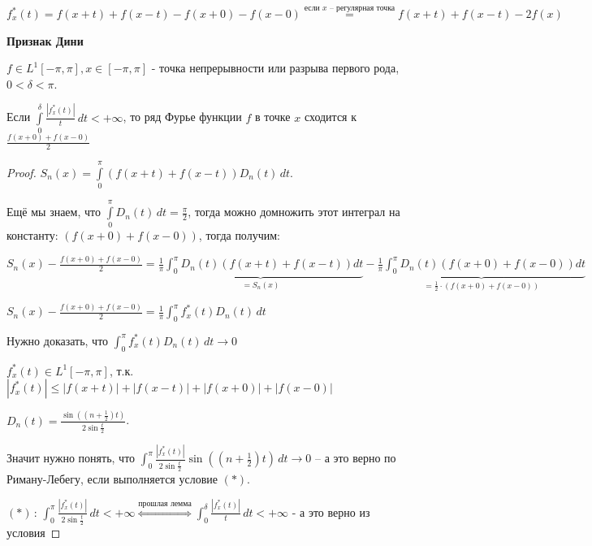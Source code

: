 \begin{definition}
    $f_x^* (t) = f(x + t) + f(x - t) - f(x + 0) - f(x - 0) \overset{\text{если $x$ -- регулярная точка}}{=} f(x + t) + f(x - t) - 2f(x)$    
\end{definition}

\begin{theorem}
    \textbf{Признак Дини}

    $f \in L^{1} [-\pi, \pi], x \in [-\pi, \pi]$ - точка непрерывности или разрыва первого рода, $0 < \delta < \pi$.
    
    Если $\int\limits_0^\delta \frac{|f_x^* (t)|}{t} \, dt < +\infty$, то ряд Фурье 
    функции $f$ в точке $x$ сходится к $\frac{f(x + 0) + f(x - 0)}{2}$
\end{theorem}

\begin{proof}
    $S_n (x) = \int\limits_0^\pi (f(x + t) + f(x - t)) D_n (t) \, dt$.
    
    Ещё мы знаем, что $\int\limits_0^\pi D_n (t) \, dt = \frac{\pi}{2}$, тогда можно домножить этот интеграл на константу: $(f(x + 0) + f(x - 0))$, тогда получим:

    $S_n(x) - \frac{f(x + 0) + f(x - 0)}{2} = \underbrace{\frac{1}{\pi} \int_{0}^{\pi} D_n(t) (f(x + t) + f(x - t)) dt}_{=S_n(x)} - \underbrace{\frac{1}{\pi} \int_{0}^{\pi} D_n(t) (f(x + 0) + f(x - 0)) dt}_{=\frac{1}{2} \cdot (f(x + 0) + f(x - 0))}$

    $S_n(x) - \frac{f(x + 0) + f(x - 0)}{2} = \frac{1}{\pi} \int_0^\pi f_x^* (t) D_n (t) \, dt $

    Нужно доказать, что $\int_0^\pi f_x^* (t) D_n (t) \, dt \rightarrow 0$

    $f_x^* (t) \in L^1 [-\pi, \pi]$, т.к. $|f_x^* (t)| \leqslant |f(x + t)| + |f(x - t)| + |f(x + 0)| + |f(x - 0)|$

    $D_n(t) = \frac{\sin ((n + \frac{1}{2})t)}{2\sin \frac{t}{2}}$.
    
    Значит нужно понять, что $\int_0^\pi \frac{|f_x^* (t)|}{2 \sin \frac{t}{2}} \sin ((n + \frac{1}{2})t) \, dt \rightarrow 0$ -- а это верно по Риману-Лебегу, если выполняется условие $(*)$.

    $(*) \, : \, \int_0^\pi \frac{|f_x^* (t)|}{2 \sin \frac{t}{2}} \, dt < +\infty \overset{\text{прошлая лемма}}{\Longleftrightarrow} \int_0^\delta \frac{|f_x^* (t)|}{t} \, dt < +\infty$ - а это верно из условия 
\end{proof}

